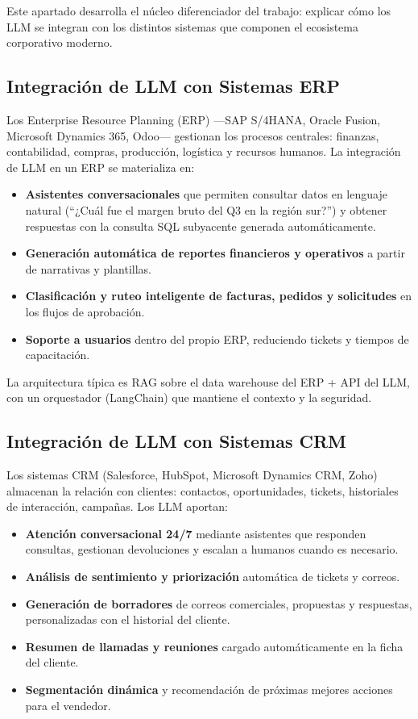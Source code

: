 \documentclass[12pt,a4paper,oneside]{article}
\begin{document}
Este apartado desarrolla el núcleo diferenciador del trabajo: explicar cómo los LLM se integran con los distintos sistemas que componen el ecosistema corporativo moderno.

\subsection{Integración de LLM con Sistemas ERP}

Los Enterprise Resource Planning (ERP) ---SAP S/4HANA, Oracle Fusion, Microsoft Dynamics 365, Odoo--- gestionan los procesos centrales: finanzas, contabilidad, compras, producción, logística y recursos humanos. La integración de LLM en un ERP se materializa en:

\begin{itemize}[leftmargin=*]
    \item \textbf{Asistentes conversacionales} que permiten consultar datos en lenguaje natural (``¿Cuál fue el margen bruto del Q3 en la región sur?'') y obtener respuestas con la consulta SQL subyacente generada automáticamente.
    \item \textbf{Generación automática de reportes financieros y operativos} a partir de narrativas y plantillas.
    \item \textbf{Clasificación y ruteo inteligente de facturas, pedidos y solicitudes} en los flujos de aprobación.
    \item \textbf{Soporte a usuarios} dentro del propio ERP, reduciendo tickets y tiempos de capacitación.
\end{itemize}

La arquitectura típica es RAG sobre el data warehouse del ERP + API del LLM, con un orquestador (LangChain) que mantiene el contexto y la seguridad.

\subsection{Integración de LLM con Sistemas CRM}

Los sistemas CRM (Salesforce, HubSpot, Microsoft Dynamics CRM, Zoho) almacenan la relación con clientes: contactos, oportunidades, tickets, historiales de interacción, campañas. Los LLM aportan:

\begin{itemize}[leftmargin=*]
    \item \textbf{Atención conversacional 24/7} mediante asistentes que responden consultas, gestionan devoluciones y escalan a humanos cuando es necesario.
    \item \textbf{Análisis de sentimiento y priorización} automática de tickets y correos.
    \item \textbf{Generación de borradores} de correos comerciales, propuestas y respuestas, personalizadas con el historial del cliente.
    \item \textbf{Resumen de llamadas y reuniones} cargado automáticamente en la ficha del cliente.
    \item \textbf{Segmentación dinámica} y recomendación de próximas mejores acciones para el vendedor.
\end{itemize}
\end{document}
